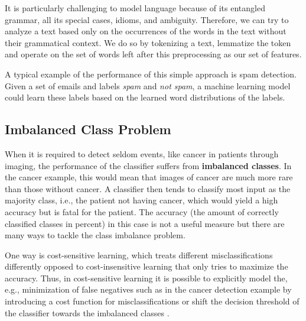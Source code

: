   It is particularly challenging to model language because of its entangled grammar, all its special cases, idioms, and ambiguity.
  Therefore, we can try to analyze a text based only on the occurrences of the words in the text without their grammatical context.
  We do so by tokenizing a text, lemmatize the token and operate on the set of words left after this preprocessing as our set of features.

  A typical example of the performance of this simple approach is spam detection.
  Given a set of emails and labels \textsl{spam} and \textsl{not spam}, a machine learning model could learn these labels based on the learned word distributions of the labels.

\subsection{Imbalanced Class Problem}
  When it is required to detect seldom events, like cancer in patients through imaging, the performance of the classifier suffers from \textbf{imbalanced classes}.
  In the cancer example, this would mean that images of cancer are much more rare than those without cancer.
  A classifier then tends to classify most input as the majority class, i.e., the patient not having cancer, which would yield a high accuracy but is fatal for the patient.
  The accuracy (the amount of correctly classified classes in percent) in this case is not a useful measure but there are many ways to tackle the class imbalance problem.

  One way is cost-sensitive learning, which treats different misclassifications differently opposed to cost-insensitive learning that only tries to maximize the accuracy.
  Thus, in cost-sensitive learning it is possible to explicitly model the, e.g., minimization of false negatives such as in the cancer detection example by introducing a cost function for misclassifications or shift the decision threshold of the classifier towards the imbalanced classes \citep{Ling2008}.

